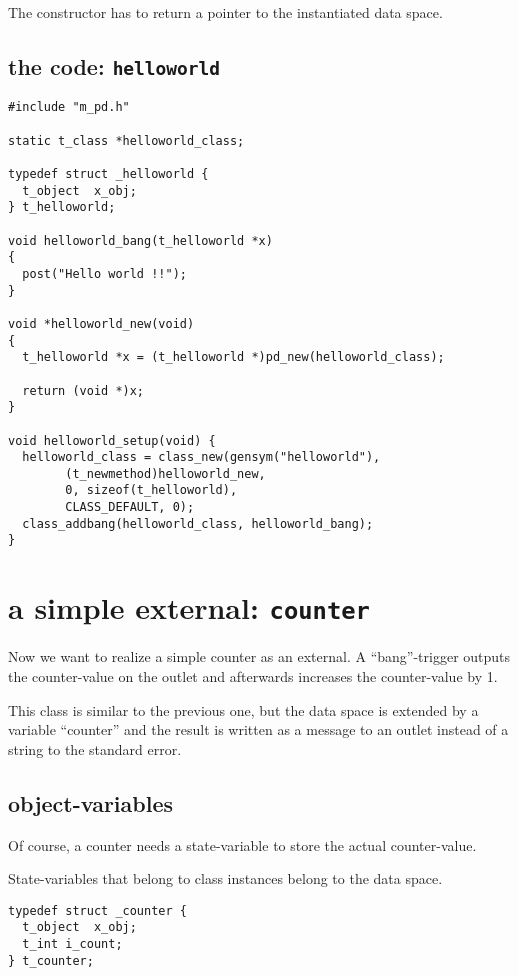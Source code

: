 \documentclass[12pt, a4paper,english,titlepage]{article}
\begin{document}
The constructor has to return a pointer to the instantiated data space.

\subsection{the code: \tt helloworld}

\begin{verbatim}
#include "m_pd.h"

static t_class *helloworld_class;

typedef struct _helloworld {
  t_object  x_obj;
} t_helloworld;

void helloworld_bang(t_helloworld *x)
{
  post("Hello world !!");
}

void *helloworld_new(void)
{
  t_helloworld *x = (t_helloworld *)pd_new(helloworld_class);

  return (void *)x;
}

void helloworld_setup(void) {
  helloworld_class = class_new(gensym("helloworld"),
        (t_newmethod)helloworld_new,
        0, sizeof(t_helloworld),
        CLASS_DEFAULT, 0);
  class_addbang(helloworld_class, helloworld_bang);
}
\end{verbatim}


\section{a simple external: {\tt counter}}

Now we want to realize a simple counter as an external.
A ``bang''-trigger outputs the counter-value on the outlet and
afterwards increases the counter-value by 1.

This class is similar to the previous one,
but the data space is extended by a variable ``counter'' and the
result is written as a message to an outlet instead of 
a string to the standard error.

\subsection{object-variables}
Of course, a counter needs a state-variable to store the actual counter-value.

State-variables that belong to class instances belong to the data space.

\begin{verbatim}
typedef struct _counter {
  t_object  x_obj;
  t_int i_count;
} t_counter;
\end{verbatim}
\end{document}
